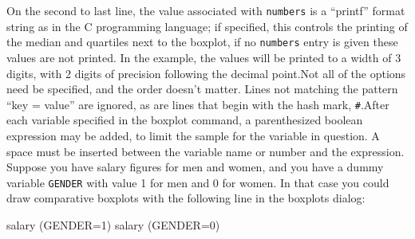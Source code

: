 On the second to last line, the value associated with \verb+numbers+
is a ``printf'' format string as in the C programming language; if
specified, this controls the printing of the median and quartiles next
to the boxplot, if no \verb+numbers+ entry is given these values are
not printed.  In the example, the values will be printed to a width of
3 digits, with 2 digits of precision following the decimal point.Not
all of the options need be specified, and the order doesn't matter.
Lines not matching the pattern ``key = value'' are ignored, as are
lines that begin with the hash mark, \verb+#+.After each variable
specified in the boxplot command, a parenthesized boolean expression
may be added, to limit the sample for the variable in question.  A
space must be inserted between the variable name or number and the
expression.  Suppose you have salary figures for men and women, and
you have a dummy variable \verb+GENDER+ with value 1 for men and 0 for
women.  In that case you could draw comparative boxplots with the
following line in the boxplots dialog:

\begin{code}
    salary (GENDER=1) salary (GENDER=0)
\end{code}


